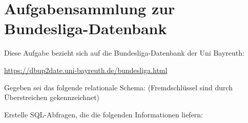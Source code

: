 \documentclass{lehramt-informatik}
\begin{document}
\section{Aufgabensammlung zur Bundesliga-Datenbank}

Diese Aufgabe bezieht sich auf die Bundesliga-Datenbank der Uni
Bayreuth:

\url{https://dbup2date.uni-bayreuth.de/bundesliga.html}

Gegeben sei das folgende relationale Schema: (Fremdschlüssel sind durch
Überstreichen gekennzeichnet)

Erstelle SQL-Abfragen, die die folgenden Informationen liefern:






\end{document}
